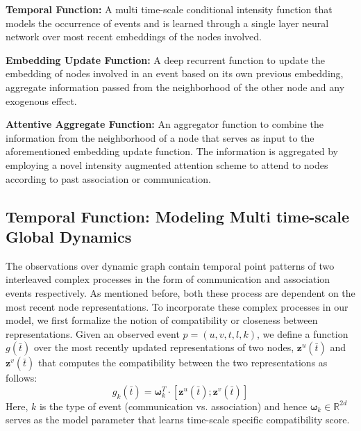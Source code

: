 \documentclass[11pt]{article}
\begin{document}
 {\bf Temporal Function:} A multi time-scale conditional intensity function that models the occurrence of events and is learned through a single layer neural network over most recent embeddings of the nodes involved.

 {\bf Embedding Update Function:} A deep recurrent function to update the embedding of nodes involved in an event based on its own previous embedding, aggregate information passed from the neighborhood of the other node and any exogenous effect.
 
{\bf Attentive Aggregate Function:} An aggregator function to combine the information from the neighborhood of a node that serves as input to the aforementioned embedding update function. The information is aggregated by employing a novel intensity augmented attention scheme to attend to nodes according to past association or communication.

\vspace{-2mm}
\subsection{Temporal Function: Modeling Multi time-scale Global Dynamics}
\vspace{-2mm}

The observations over dynamic graph contain temporal point patterns of two interleaved complex processes in the form of communication and association events respectively. As mentioned before, both these process are dependent on the most recent node representations. To incorporate these complex processes in our model, we first formalize the notion of compatibility or closeness between representations. 
Given an observed event $p = (u, v, t, l, k)$, we define a function $g(\bar{t})$ over the most recently updated representations of two nodes, $\mathbf{z}^u(\bar{t})$ and $\mathbf{z}^v(\bar{t})$ that computes the compatibility between the two representations as follows:
\begin{equation}\label{g2}
g_k(\bar{t}) = \bm{\omega}_k^T \cdot [\mathbf{z}^u(\bar{t});\mathbf{z}^v(\bar{t})]
\end{equation}
Here, $k$ is the type of event (communication vs. association) and hence $\bm{\omega}_k \in \mathbb{R}^{2d}$ serves as the model parameter that learns time-scale specific compatibility score. 
\end{document}
